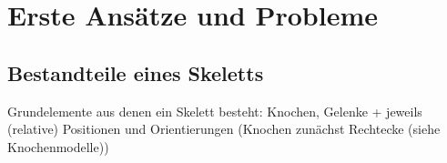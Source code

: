 \chapter{Erste Ansätze und Probleme}

\section{Bestandteile eines Skeletts}

Grundelemente aus denen ein Skelett besteht: Knochen, Gelenke + jeweils (relative) Positionen und Orientierungen (Knochen zunächst Rechtecke (siehe Knochenmodelle))

